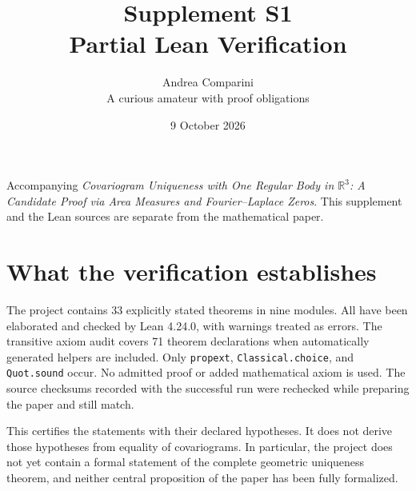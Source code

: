 \documentclass[11pt,a4paper]{article}
\title{Supplement S1\\Partial Lean Verification}
\author{Andrea Comparini\\\small A curious amateur with proof obligations}
\date{9 October 2026}
\begin{document}
\maketitle

\noindent Accompanying \emph{Covariogram Uniqueness with One Regular Body in
$\mathbb R^3$: A Candidate Proof via Area Measures and Fourier--Laplace Zeros}.
This supplement and the Lean sources are separate from the mathematical paper.

\section{What the verification establishes}
The project contains 33 explicitly stated theorems in nine modules.
All have been elaborated and checked by Lean 4.24.0, with warnings treated
as errors. The transitive axiom audit covers 71 theorem declarations when
automatically generated helpers are included. Only
\texttt{propext}, \texttt{Classical.choice}, and \texttt{Quot.sound}
occur. No admitted proof or added mathematical axiom is used.
The source checksums recorded with the successful run were rechecked
while preparing the paper and still match.

This certifies the statements with their declared hypotheses.
It does not derive those hypotheses from equality of covariograms.
In particular, the project does not yet contain a formal statement of the
complete geometric uniqueness theorem, and neither central proposition
of the paper has been fully formalized.
\end{document}
